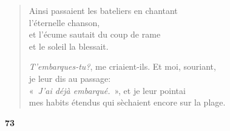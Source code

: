 \documentclass[a4paper,12pt]{book}
\begin{document}
\begin{verse}
  Ainsi passaient les bateliers en chantant \\
  l'éternelle chanson, \\
  et l'écume sautait du coup de rame \\
  et le soleil la blessait.

  \emph{T'embarques-tu?}, me criaient-ils. Et moi, souriant, \\
  je leur dis au passage: \\
  «~\emph{J'ai déjà embarqué.}~», et je leur pointai \\
  mes habits étendus qui sèchaient encore sur la plage.
\end{verse}

\bigskip

\begin{center}
  \textbf{73}
\end{center}

\settowidth{\versewidth}{D'une horloge on entendait}
\end{document}
